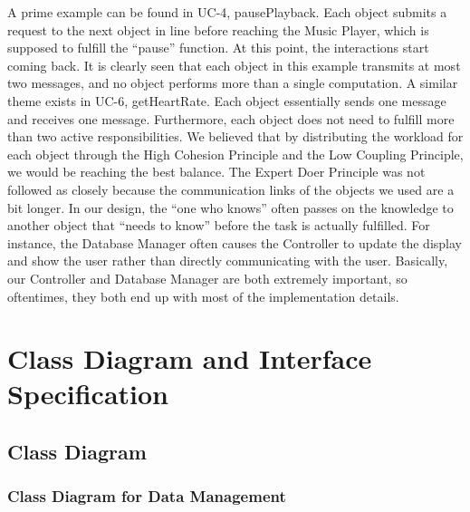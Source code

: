 \documentclass[letterpaper,english, 12pt]{scrreprt}
\begin{document}
A prime example can be found in UC-4, pausePlayback. Each object submits a request to the next object in line before reaching the Music Player, which is supposed to fulfill the ``pause'' function. At this point, the interactions start coming back. It is clearly seen that each object in this example transmits at most two messages, and no object performs more than a single computation. A similar theme exists in UC-6, getHeartRate. Each object essentially sends one message and receives one message. Furthermore, each object does not need to fulfill more than two active responsibilities. We believed that by distributing the workload for each object through the High Cohesion Principle and the Low Coupling Principle, we would be reaching the best balance.
The Expert Doer Principle was not followed as closely because the communication links of the objects we used are a bit longer. In our design, the ``one who knows'' often passes on the knowledge to another object that ``needs to know'' before the task is actually fulfilled. For instance, the Database Manager often causes the Controller to update the display and show the user rather than directly communicating with the user. Basically, our Controller and Database Manager are both extremely important, so oftentimes, they both end up with most of the implementation details.

\chapter{Class Diagram and Interface Specification}

\section{Class Diagram}
\subsection{Class Diagram for Data Management}
\end{document}

